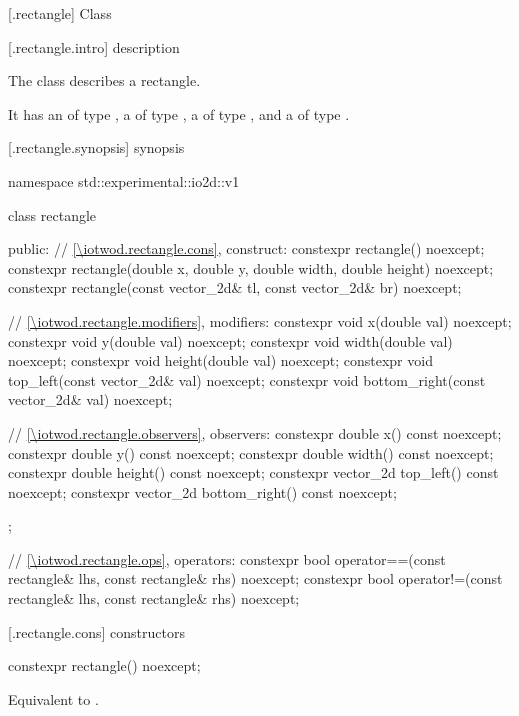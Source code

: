  [\iotwod.rectangle] {Class }

 [\iotwod.rectangle.intro] { description}

%
\pnum
The class  describes a rectangle.

\pnum
It has an  of type , a  of type , a  of type , and a  of type .

 [\iotwod.rectangle.synopsis] { synopsis}

\begin{codeblock}
namespace std::experimental::io2d::v1 {
  class rectangle {
  public:
    // \ref{\iotwod.rectangle.cons}, construct:
    constexpr rectangle() noexcept;
    constexpr rectangle(double x, double y, double width, double height)
      noexcept;
    constexpr rectangle(const vector_2d& tl, const vector_2d& br) noexcept;

    // \ref{\iotwod.rectangle.modifiers}, modifiers:
    constexpr void x(double val) noexcept;
    constexpr void y(double val) noexcept;
    constexpr void width(double val) noexcept;
    constexpr void height(double val) noexcept;
    constexpr void top_left(const vector_2d& val) noexcept;
    constexpr void bottom_right(const vector_2d& val) noexcept;
    
    // \ref{\iotwod.rectangle.observers}, observers:
    constexpr double x() const noexcept;
    constexpr double y() const noexcept;
    constexpr double width() const noexcept;
    constexpr double height() const noexcept;
    constexpr vector_2d top_left() const noexcept;
    constexpr vector_2d bottom_right() const noexcept;
  };
  
  // \ref{\iotwod.rectangle.ops}, operators:
  constexpr bool operator==(const rectangle& lhs, const rectangle& rhs) 
    noexcept;
  constexpr bool operator!=(const rectangle& lhs, const rectangle& rhs) 
    noexcept;
}
\end{codeblock}

 [\iotwod.rectangle.cons] { constructors}

%
\begin{itemdecl}
constexpr rectangle() noexcept;
\end{itemdecl}
\begin{itemdescr}
\pnum
\effects
Equivalent to .
\end{itemdescr}

